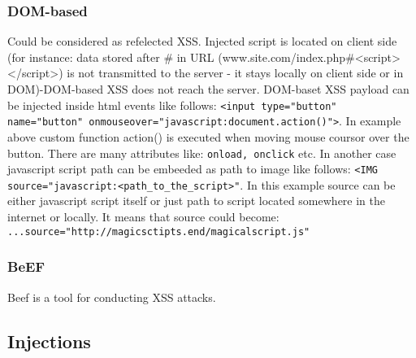 \documentclass{article}[12pt]
\begin{document}
\subsubsection{DOM-based} Could be considered as refelected XSS. Injected script is located on client side (for instance: data stored after \# in URL (www.site.com/index.php\#<script></script>) is not transmitted to the server - it stays locally on client side or in DOM)-DOM-based XSS does not reach the server.
DOM-baset XSS payload can be injected inside html events like follows: \texttt{<input type="button" name="button" onmouseover="javascript:document.action()">}.
In example above custom function action() is executed when moving mouse coursor over the button.
There are many attributes like: \texttt{onload, onclick} etc.
In another case javascript script path can be embeeded as path to image like follows:
\texttt{<IMG source="javascript:<path\_to\_the\_script>"}.
In this example source can be either javascript script itself or just path to script located somewhere in the internet or locally.
It means that source could become:
\texttt{...source="http://magicsctipts.end/magicalscript.js"}

\subsubsection{BeEF} Beef is a tool for conducting XSS attacks.





\subsection{Injections}
\end{document}
